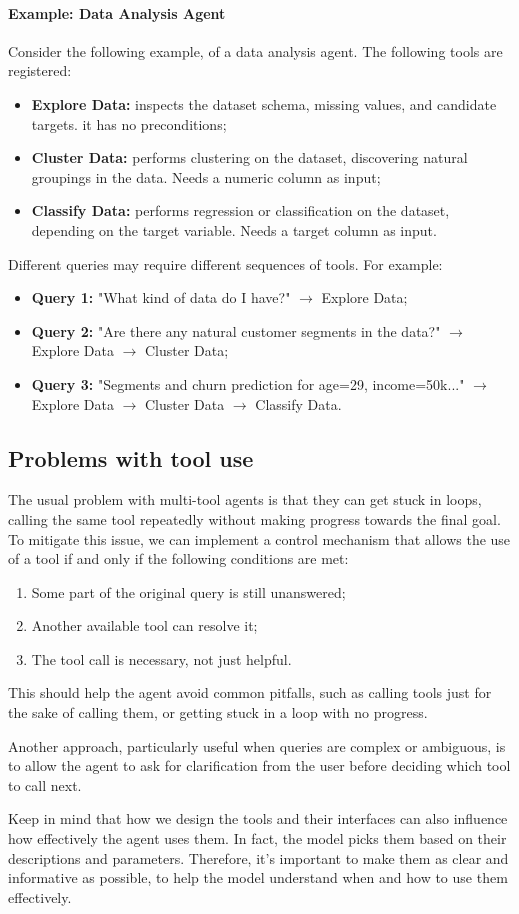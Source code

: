\paragraph{Example: Data Analysis Agent}
Consider the following example, of a data analysis agent. The following tools are registered:
\begin{itemize}
    \item \textbf{Explore Data:} inspects the dataset schema, missing values, and candidate targets. it has no preconditions;
    \item \textbf{Cluster Data:} performs clustering on the dataset, discovering natural groupings in the data. Needs a numeric column as input;
    \item \textbf{Classify Data:} performs regression or classification on the dataset, depending on the target variable. Needs a target column as input.
\end{itemize}

Different queries may require different sequences of tools. For example:
\begin{itemize}
    \item \textbf{Query 1:} "What kind of data do I have?" $\rightarrow$ Explore Data;
    \item \textbf{Query 2:} "Are there any natural customer segments in the data?" $\rightarrow$ Explore Data $\rightarrow$ Cluster Data;
    \item \textbf{Query 3:} "Segments and churn prediction for age=29, income=50k..." $\rightarrow$ Explore Data $\rightarrow$ Cluster Data $\rightarrow$ Classify Data.
\end{itemize}

\subsection{Problems with tool use}
The usual problem with multi-tool agents is that they can get stuck in loops, calling the same tool repeatedly without making progress towards the final goal.
To mitigate this issue, we can implement a control mechanism that allows the use of a tool if and only if the following conditions are met:
\begin{enumerate}
    \item Some part of the original query is still unanswered;
    \item Another available tool can resolve it;
    \item The tool call is necessary, not just helpful.
\end{enumerate}
This should help the agent avoid common pitfalls, such as calling tools just for the sake of calling them, or getting stuck in a loop with no progress.

Another approach, particularly useful when queries are complex or ambiguous, is to allow the agent to ask for clarification 
from the user before deciding which tool to call next.

Keep in mind that how we design the tools and their interfaces can also influence how effectively the agent uses them.
In fact, the model picks them based on their descriptions and parameters. Therefore, it's important to
make them as clear and informative as possible, to help the model understand when and how to use them effectively.